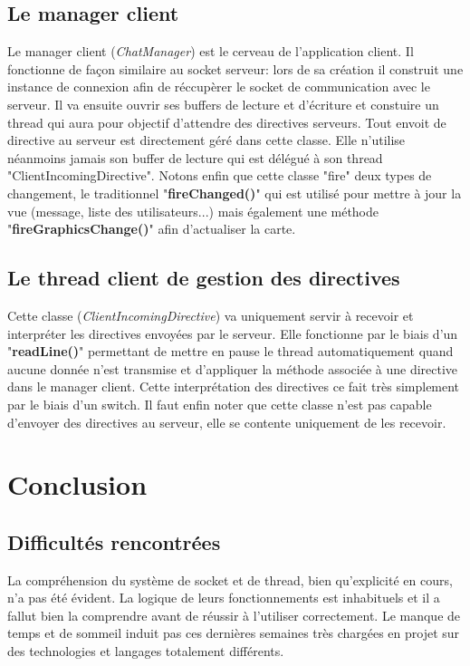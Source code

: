 \documentclass[a4paper,12pt]{report}
\begin{document}
    \section{Le manager client}
      Le manager client (\emph{ChatManager}) est le cerveau de l'application client. Il fonctionne de façon similaire au socket serveur: lors de sa création il construit une instance de connexion afin de réccupèrer le socket de communication avec le serveur. Il va ensuite ouvrir ses buffers de lecture et d'écriture et constuire un thread qui aura pour objectif d'attendre des directives serveurs.
      \medbreak
      Tout envoit de directive au serveur est directement géré dans cette classe. Elle n'utilise néanmoins jamais son buffer de lecture qui est délégué à son thread "ClientIncomingDirective".
      \medbreak
      Notons enfin que cette classe "fire" deux types de changement, le traditionnel "\textbf{fireChanged()}" qui est utilisé pour mettre à jour la vue (message, liste des utilisateurs...) mais également une méthode "\textbf{fireGraphicsChange()}" afin d'actualiser la carte.

    \section{Le thread client de gestion des directives}
      Cette classe (\emph{ClientIncomingDirective}) va uniquement servir à recevoir et interpréter les directives envoyées par le serveur. Elle fonctionne par le biais d'un "\textbf{readLine()}" permettant de mettre en pause le thread automatiquement quand aucune donnée n'est transmise et d'appliquer la méthode associée à une directive dans le manager client. Cette interprétation des directives ce fait très simplement par le biais d'un switch.
      \medbreak
      Il faut enfin noter que cette classe n'est pas capable d'envoyer des directives au serveur, elle se contente uniquement de les recevoir.

  \chapter{Conclusion}

    \section{Difficultés rencontrées}
      La compréhension du système de socket et de thread, bien qu'explicité en cours, n'a pas été évident. La logique de leurs fonctionnements est inhabituels et il a fallut bien la comprendre avant de réussir à l'utiliser correctement.
      \medbreak
      Le manque de temps et de sommeil induit pas ces dernières semaines très chargées en projet sur des technologies et langages totalement différents.
\end{document}
